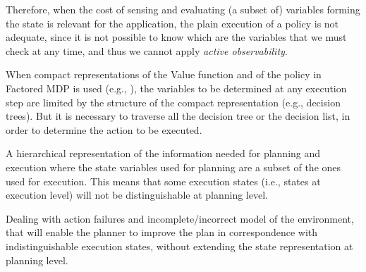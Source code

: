 Therefore, when the cost of sensing and evaluating (a subset of) variables forming the state is relevant for the application, the plain execution of a policy is not adequate, since it is not possible to know which are the variables that we must check at any time, and thus we cannot apply \emph{active observability}.

When compact representations of the Value function and of the policy in Factored MDP is used (e.g., \cite{Hoey99spudd,KoPa00}), the variables to be determined at any execution step are limited by the structure of the compact representation (e.g., decision trees). But it is necessary to traverse all the decision tree or the decision list, in order to determine the action to be executed.






A hierarchical representation of the information needed for planning and execution where the state variables used for planning are a subset of the ones used for execution. This means that some execution states (i.e., states at execution level) will not be distinguishable at planning level.


Dealing with action failures and incomplete/incorrect model of the environment, that will enable the planner to improve the plan in correspondence with indistinguishable execution states, without extending the state representation at planning level.






